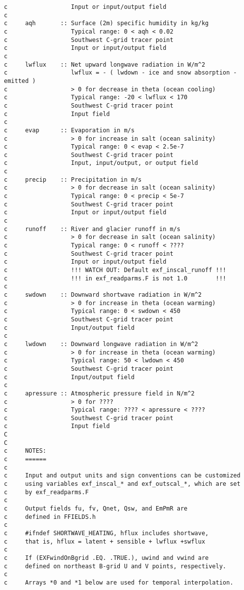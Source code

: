 {\begin{verbatim}
c                  Input or input/output field
c
c     aqh       :: Surface (2m) specific humidity in kg/kg
c                  Typical range: 0 < aqh < 0.02
c                  Southwest C-grid tracer point
c                  Input or input/output field
c
c     lwflux    :: Net upward longwave radiation in W/m^2
c                  lwflux = - ( lwdown - ice and snow absorption - emitted )
c                  > 0 for decrease in theta (ocean cooling)
c                  Typical range: -20 < lwflux < 170
c                  Southwest C-grid tracer point
c                  Input field
c
c     evap      :: Evaporation in m/s
c                  > 0 for increase in salt (ocean salinity)
c                  Typical range: 0 < evap < 2.5e-7
c                  Southwest C-grid tracer point
c                  Input, input/output, or output field
c
c     precip    :: Precipitation in m/s
c                  > 0 for decrease in salt (ocean salinity)
c                  Typical range: 0 < precip < 5e-7
c                  Southwest C-grid tracer point
c                  Input or input/output field
c
c     runoff    :: River and glacier runoff in m/s
c                  > 0 for decrease in salt (ocean salinity)
c                  Typical range: 0 < runoff < ????
c                  Southwest C-grid tracer point
c                  Input or input/output field
c                  !!! WATCH OUT: Default exf_inscal_runoff !!!
c                  !!! in exf_readparms.F is not 1.0        !!!
c
c     swdown    :: Downward shortwave radiation in W/m^2
c                  > 0 for increase in theta (ocean warming)
c                  Typical range: 0 < swdown < 450
c                  Southwest C-grid tracer point
c                  Input/output field
c
c     lwdown    :: Downward longwave radiation in W/m^2
c                  > 0 for increase in theta (ocean warming)
c                  Typical range: 50 < lwdown < 450
c                  Southwest C-grid tracer point
c                  Input/output field
c
c     apressure :: Atmospheric pressure field in N/m^2
c                  > 0 for ????
c                  Typical range: ???? < apressure < ????
c                  Southwest C-grid tracer point
c                  Input field
C
C
c     NOTES:
c     ======
c
c     Input and output units and sign conventions can be customized
c     using variables exf_inscal_* and exf_outscal_*, which are set
c     by exf_readparms.F
c
c     Output fields fu, fv, Qnet, Qsw, and EmPmR are
c     defined in FFIELDS.h
c
c     #ifndef SHORTWAVE_HEATING, hflux includes shortwave,
c     that is, hflux = latent + sensible + lwflux +swflux
c
c     If (EXFwindOnBgrid .EQ. .TRUE.), uwind and vwind are
c     defined on northeast B-grid U and V points, respectively.
c
c     Arrays *0 and *1 below are used for temporal interpolation.
\end{verbatim}
}

